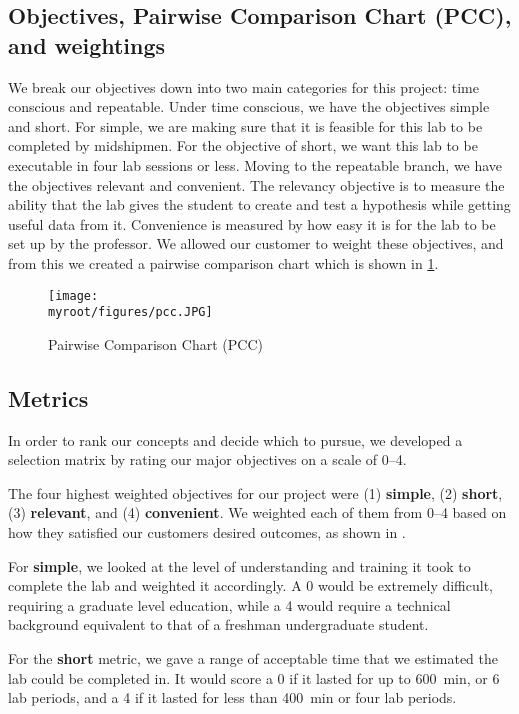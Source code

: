 \documentclass[twocolumn,10pt]{IEEEtran}
\newcommand{\myroot}{.}
\begin{document}
\subsection{Objectives, Pairwise Comparison Chart (PCC), and weightings}
\label{subsec:objectives}
We break our objectives down into two main categories for this project: time conscious and repeatable. Under time conscious, we have the objectives simple and short. For simple, we are making sure that it is feasible for this lab to be completed by midshipmen. For the objective of short, we want this lab to be executable in four lab sessions or less. Moving to the repeatable branch, we have the objectives relevant and convenient. The relevancy objective is to measure the ability that the lab gives the student to create and test a hypothesis while getting useful data from it. Convenience is measured by how easy it is for the lab to be set up by the professor. We allowed our customer to weight these objectives, and from this we created a pairwise comparison chart which is shown in \ref{fig:pcc}. 
\begin{figure}[ht!]
\centering
\texttt{[image: \\myroot/figures/pcc.JPG]}
\caption{Pairwise Comparison Chart (PCC)}
\label{fig:pcc}
\end{figure}

\subsection{Metrics}
In order to rank our concepts and decide which to pursue, we developed a selection matrix by rating our major objectives on a scale of 0--4. 

The four highest weighted objectives for our project were (1) \textbf{simple}, (2) \textbf{short}, (3) \textbf{relevant}, and (4) \textbf{convenient}. We weighted each of them from 0--4 based on how they satisfied our customers desired outcomes, as shown in . 

For \textbf{simple}, we looked at the level of understanding and training it took to complete the lab and weighted it accordingly. A 0 would be extremely difficult, requiring a graduate level education, while a 4 would require a technical background equivalent to that of a freshman undergraduate student. 

For the \textbf{short} metric, we gave a range of acceptable time that we estimated the lab could be completed in. It would score a 0 if it lasted for up to \SI{600}{\minute}, or 6 lab periods, and a 4 if it lasted for less than \SI{400}{\minute} or four lab periods. 
\end{document}
